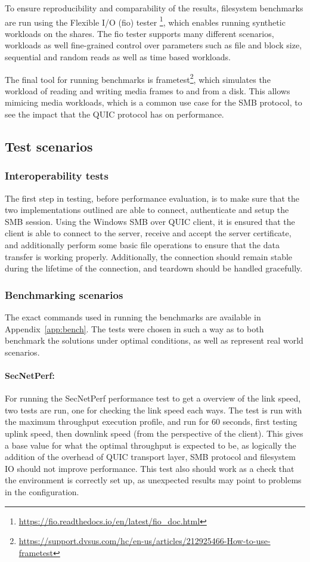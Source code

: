 \documentclass[english, 12pt, a4paper, elec, utf8, a-2b, online]{aaltothesis}
\begin{document}
To ensure reproducibility and comparability of the results, filesystem benchmarks are run
using the Flexible I/O (fio) tester \footnote{\url{https://fio.readthedocs.io/en/latest/fio_doc.html}},
which enables running synthetic workloads on the shares. The fio tester supports
many different scenarios, workloads as well fine-grained control over parameters
such as file and block size, sequential and random reads as well as time based workloads.

The final tool for running benchmarks is frametest\footnote{\url{https://support.dvsus.com/hc/en-us/articles/212925466-How-to-use-frametest}}, which simulates the workload of
reading and writing media frames to and from a disk. This allows mimicing media
workloads, which is a common use case for the SMB protocol, to see the impact that
the QUIC protocol has on performance.

\subsection{Test scenarios}

\subsubsection{Interoperability tests}

The first step in testing, before performance evaluation, is to make sure that
the two implementations outlined are able to connect, authenticate and setup
the SMB session. Using the Windows SMB over QUIC client, it is ensured that the client
is able to connect to the server, receive and accept the server certificate, and
additionally perform some basic file operations to ensure that the data transfer is
working properly. Additionally, the connection should remain stable during the lifetime
of the connection, and teardown should be handled gracefully.

\subsubsection{Benchmarking scenarios}

The exact commands used in running the benchmarks are available in Appendix~\ref{app:bench}.
The tests were chosen in such a way as to both benchmark the solutions under optimal conditions,
as well as represent real world scenarios.

\paragraph{SecNetPerf:}
For running the SecNetPerf performance test to get a overview of the link speed,
two tests are run, one for checking the link speed each ways. The test is run with the maximum
throughput execution profile, and run for 60 seconds, first testing uplink speed,
then downlink speed (from the perspective of the client). This gives a base value for
what the optimal throughput is expected to be, as logically the addition of the
overhead of QUIC transport layer, SMB protocol and filesystem IO should not improve
performance. This test also should work as a check that the environment is correctly
set up, as unexpected results may point to problems in the configuration.
\end{document}
